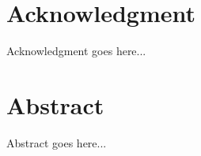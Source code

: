 \chapter*{Acknowledgment}
Acknowledgment goes here...

\cleardoublepage
\chapter*{Abstract}
Abstract goes here...
